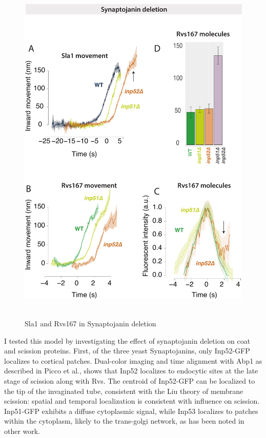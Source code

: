		\begin{figure}
		\centering
		\includegraphics[width=17cm,height=17cm,keepaspectratio]{figures/results_final/inp_movement}
		\caption{Sla1 and Rvs167 in Synaptojanin deletion \label{fig5}}
		\end{figure}		

	\vspace{5mm}
	I tested this model by investigating the effect of synaptojanin deletion on coat and scission proteins. First, of the three yeast Synaptojanins, only Inp52-GFP localizes to cortical patches. Dual-color imaging and time alignment with Abp1 as described in Picco et al., shows that Inp52 localizes to endocytic sites at the late stage of scission along with Rvs. The centroid of Inp52-GFP can be localized to the tip of the invaginated tube, consistent with the Liu theory of membrane scission: spatial and temporal localization is consistent with influence on scission. Inp51-GFP exhibits a diffuse cytoplasmic signal, while Inp53 localizes to patches within the cytoplasm, likely to the trans-golgi network, as has been noted in other work. 



